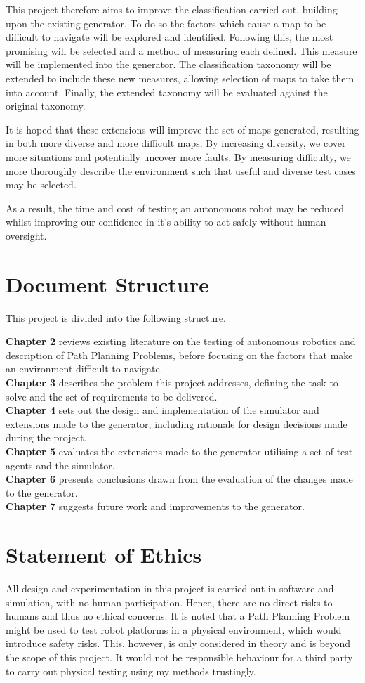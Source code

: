\documentclass[authoryearcitations]{UoYCSproject}
\begin{document}
This project therefore aims to improve the classification carried out, building upon the existing generator. To do so the factors which cause a map to be difficult to navigate will be explored and identified. Following this, the most promising will be selected and a method of measuring each defined. This measure will be implemented into the generator. The classification taxonomy will be extended to include these new measures, allowing selection of maps to take them into account. Finally, the extended taxonomy will be evaluated against the original taxonomy.

It is hoped that these extensions will improve the set of maps generated, resulting in both more diverse and more difficult maps. By increasing diversity, we cover more situations and potentially uncover more faults. By measuring difficulty, we more thoroughly describe the environment such that useful and diverse test cases may be selected.

As a result, the time and cost of testing an autonomous robot may be reduced whilst improving our confidence in it's ability to act safely without human oversight.

\section{Document Structure}
\label{sec:DocStruct}
This project is divided into the following structure.

\textbf{Chapter 2} reviews existing literature on the testing of autonomous robotics and description of Path Planning Problems, before focusing on the factors that make an environment difficult to navigate.\\
\textbf{Chapter 3} describes the problem this project addresses, defining the task to solve and the set of requirements to be delivered.\\
\textbf{Chapter 4} sets out the design and implementation of the simulator and extensions made to the generator, including rationale for design decisions made during the project.\\
\textbf{Chapter 5} evaluates the extensions made to the generator utilising a set of test agents and the simulator.\\
\textbf{Chapter 6} presents conclusions drawn from the evaluation of the changes made to the generator.\\
\textbf{Chapter 7} suggests future work and improvements to the generator.

\section{Statement of Ethics}
\label{sec:Ethics}
All design and experimentation in this project is carried out in software and simulation, with no human participation. Hence, there are no direct risks to humans and thus no ethical concerns. It is noted that a Path Planning Problem might be used to test robot platforms in a physical environment, which would introduce safety risks. This, however, is only considered in theory and is beyond the scope of this project. It would not be responsible behaviour for a third party to carry out physical testing using my methods trustingly.
\end{document}
